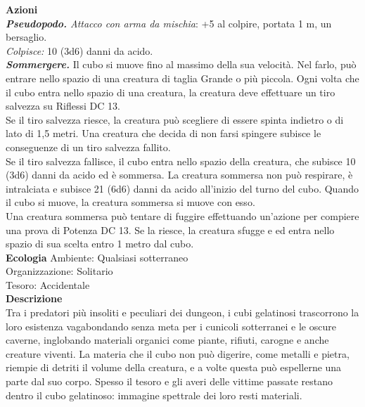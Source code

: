 \begin{multicols}{2}
\smallskip\textbf{Azioni}\\

\emph{\textbf{Pseudopodo.} Attacco con arma da mischia}: +5 al colpire, portata 1 m, un bersaglio.\\

\emph{Colpisce:} 10 (3d6) danni da acido.\\

\emph{\textbf{Sommergere.}} Il cubo si muove fino al massimo della sua velocità. Nel farlo, può entrare nello spazio di una creatura di taglia Grande o più piccola. Ogni volta che il cubo entra nello spazio di una creatura, la creatura deve effettuare un tiro salvezza su Riflessi DC  13.\\

Se il tiro salvezza riesce, la creatura può scegliere di essere spinta indietro o di lato di 1,5 metri. Una creatura che decida di non farsi spingere subisce le conseguenze di un tiro salvezza fallito.\\

Se il tiro salvezza fallisce, il cubo entra nello spazio della creatura, che subisce 10 (3d6) danni da acido ed è sommersa. La creatura sommersa non può respirare, è intralciata e subisce 21 (6d6) danni da acido all'inizio del turno del cubo. Quando il cubo si muove, la creatura sommersa si muove con esso.\\

Una creatura sommersa può tentare di fuggire effettuando un'azione per compiere una prova di Potenza DC  13. Se la riesce, la creatura sfugge e ed entra nello spazio di sua scelta entro 1 metro dal cubo.\\
\textbf{Ecologia}
Ambiente: Qualsiasi sotterraneo\\
Organizzazione: Solitario\\
Tesoro: Accidentale\\
\textbf{Descrizione}\\
Tra i predatori più insoliti e peculiari dei dungeon, i cubi gelatinosi trascorrono la loro esistenza vagabondando senza meta per i cunicoli sotterranei e le oscure caverne, inglobando materiali organici come piante, rifiuti, carogne e anche creature viventi. La materia che il cubo non può digerire, come metalli e pietra, riempie di detriti il volume della creatura, e a volte questa può espellerne una parte dal suo corpo. Spesso il tesoro e gli averi delle vittime passate restano dentro il cubo gelatinoso: immagine spettrale dei loro resti materiali.\\


\end{multicols}
